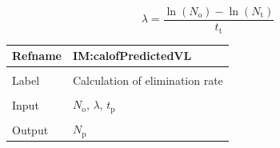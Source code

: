 \documentclass[12pt]{article}
\begin{document}
\begin{displaymath}
λ=\frac{\ln\left({N_{\text{o}}}\right)-\ln\left({N_{\text{t}}}\right)}{{t_{\text{t}}}}
\end{displaymath}
\vspace{\baselineskip}
\noindent
\begin{minipage}{\textwidth}
\begin{tabular}{>{\raggedright}p{}>{\raggedright\arraybackslash}p{}}
\toprule \textbf{Refname} & \textbf{IM:calofPredictedVL}
\label{IM:calofPredictedVL}
\\ \midrule \\
Label & Calculation of elimination rate
        
\\ \midrule \\
Input & ${N_{\text{o}}}$, $λ$, ${t_{\text{p}}}$
        
\\ \midrule \\
Output & ${N_{\text{p}}}$
         

\end{tabular}
\end{minipage}
\end{document}

